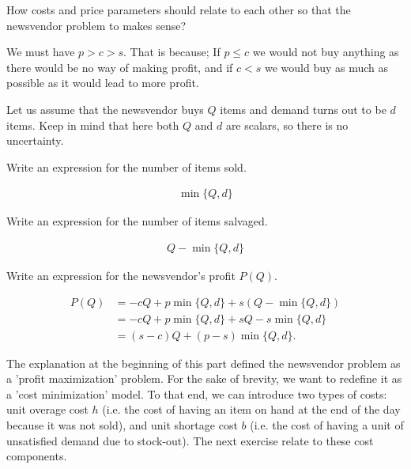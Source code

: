 \begin{question}
How costs and price parameters should relate to each other so that the newsvendor problem to makes sense?
\end{question}

\begin{solution}
We must have $p>c>s$. That is because; If $p\leq c$ we would not buy anything as there would be no way of making profit, and if $c<s$ we would buy as much as possible as it would lead to more profit. 
\end{solution}

Let us assume that the newsvendor buys $Q$ items and demand turns out to be $d$ items. Keep in mind that here both $Q$ and $d$ are scalars, so there is no uncertainty. 

\begin{question}
Write an expression for the number of items sold.
\end{question}

\begin{solution}
\begin{align*}
\min\{Q,d\}
\end{align*}
\end{solution}

\begin{question}
Write an expression for the number of items salvaged.
\end{question}

\begin{solution}
\begin{align*}
Q-\min\{Q,d\}
\end{align*}
\end{solution}

\begin{question}
Write an expression for the newsvendor's profit $P(Q)$.
\end{question}

\begin{solution}
\begin{equation*}
  \begin{split}
P(Q) 
&= -cQ + p\min\{Q,d\} + s(Q-\min\{Q,d\}) \\
&=  -cQ + p \min\{Q,d\} + sQ - s \min\{Q,d\} \\
&= (s-c)Q + (p-s) \min\{Q,d\}.
  \end{split}
\end{equation*}
\end{solution}

The explanation at the beginning of this part defined the newsvendor problem as a 'profit maximization' problem. For the sake of brevity, we want to redefine it as a 'cost minimization' model. To that end, we can introduce two types of costs: unit overage cost $h$ (i.e. the cost of having an item on hand at the end of the day because it was not sold), and unit shortage cost $b$ (i.e. the cost of having a unit of unsatisfied demand due to stock-out). The next exercise relate to these cost components.

